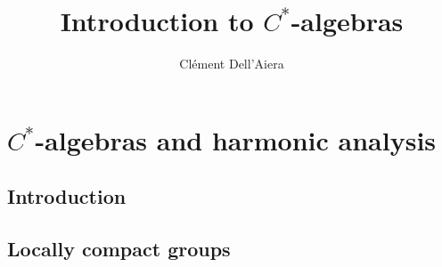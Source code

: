 \documentclass[a4paper]{book}
\title{Introduction to $C^*$-algebras}
\date{} %
\author{ Clément Dell'Aiera }
\begin{document}
  

\maketitle
\tableofcontents

\part{$C^*$-algebras and harmonic analysis}
\chapter{Introduction}


\chapter{Locally compact groups}

\end{document}
